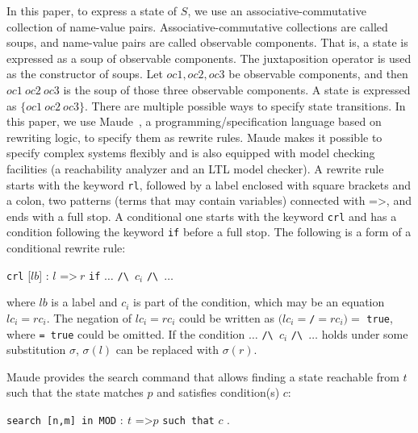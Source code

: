 \documentclass[10pt, conference, compsocconf]{IEEEtran}
\begin{document}
In this paper, to express a state of $S$, we use an associative-commutative collection of name-value pairs. Associative-commutative collections are called soups, and name-value pairs are called observable components. That is, a state is expressed as a soup of observable components.
The juxtaposition operator is used
as the constructor of soups. Let $oc1, oc2, oc3$ be observable components, and then 
$oc1\ oc2\ oc3$ is the soup of
those three observable components. A state is expressed
as $\{oc1\ oc2\ oc3\}$. There are multiple possible ways to
specify state transitions. 
In this paper, we use Maude~\cite{Clavel2007LNCS}, a programming/specification
language based on rewriting logic, to specify them as rewrite rules.
Maude makes it possible
to specify complex systems flexibly and is also equipped
with model checking facilities (a reachability analyzer and
an LTL model checker). 
A rewrite rule starts with the keyword \verb!rl!, followed by a label enclosed with square brackets and a colon, two patterns (terms that may contain variables) connected with =\textgreater, and ends with a full stop. A conditional one starts with the keyword \verb!crl! and has a condition following the keyword \verb!if! before a full stop.
The following is a form of a conditional rewrite rule:

\smallskip
\noindent
\verb!crl! [$lb$] : $l$ =\textgreater $\ r$ \verb!if! $\ldots$ \verb!/\ !$c_i$ \verb!/\ !$\ldots$
\smallskip

\noindent
where $lb$ is a label and $c_i$ is part of the condition, which may be an equation $lc_i = rc_i$. 
The negation of $lc_i = rc_i$ could be written as $(lc_i =$\verb!/!$= rc_i) =$ \verb!true!, where \verb!= true! could be omitted. 
If the condition
$\ldots$ \verb!/\ !$c_i$ \verb!/\ !$\ldots$ holds under some substitution $\sigma$, $\sigma(l)$ can be replaced with $\sigma(r)$.

Maude provides the search command that allows finding a state reachable from
$t$ such that the state matches $p$ and satisfies condition(s) $c$:

\medskip
	\noindent
	\verb!search [n,m] in MOD! $:\ t$ =\textgreater* $p$ \verb!such that! $c$ .
\medskip
\end{document}
